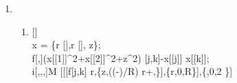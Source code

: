 \documentclass[10pt]{article}
\newcommand{\op}[1]{\pmb{\text{#1}}}
\begin{document}
\begin{enumerate}
\begin{gather*}
      \op{A}^{-1}=
      \left(
      \begin{array}{ccc}
        \cos (\psi ) \cos (\phi )-\cos (\theta ) \sin (\psi ) \sin (\phi ) & -\cos (\theta ) \cos (\psi ) \sin (\phi )-\sin (\psi ) \cos (\phi ) & \sin (\theta ) \sin (\phi ) \\
        \cos (\theta ) \sin (\psi ) \cos (\phi )+\cos (\psi ) \sin (\phi ) & \cos (\theta ) \cos (\psi ) \cos (\phi )-\sin (\psi ) \sin (\phi ) & \sin (\theta ) (-\cos (\phi )) \\
        \sin (\theta ) \sin (\psi )                                        & \sin (\theta ) \cos (\psi )                                         & \cos (\theta )                 \\
      \end{array}
      \right)\\
      \omega_{bf}=
      \begin{pmatrix}
        \theta ' \cos (\psi )+\sin (\theta ) \sin (\psi ) \phi ' \\
        \sin (\theta ) \cos (\psi ) \phi '-\theta ' \sin (\psi ) \\
        \cos (\theta ) \phi '+\psi '
      \end{pmatrix}\\
      \op{A}^{-1}\omega_{bf}=
      \begin{pmatrix}
        \theta ' \cos (\phi )+\sin (\theta ) \psi ' \sin (\phi ) \\
        \theta ' \sin (\phi )-\sin (\theta ) \psi ' \cos (\phi ) \\
        \cos (\theta ) \psi '+\phi '
      \end{pmatrix}
    \end{gather*}
    \item
    \begin{enumerate}
      \item
      \linebreak
      \parbox{\textwidth}{
        []\\
        x = \{r [\theta ],r [\theta ], z\};\\
        f[,]\text{:=}(x[[1]]{}^{\wedge}2+x[[2]]{}^{\wedge}2+z{}^{\wedge}2) [j,k]-x[[j]] x[[k]];\\
        i[,,,]\text{:=}M [[[f[j,k] r,\{z,((-)/R)
        r+,\}],\{r,0,R\}],\{\theta ,0,2 \}]\\
}
\end{enumerate}
\end{enumerate}
\end{document}
